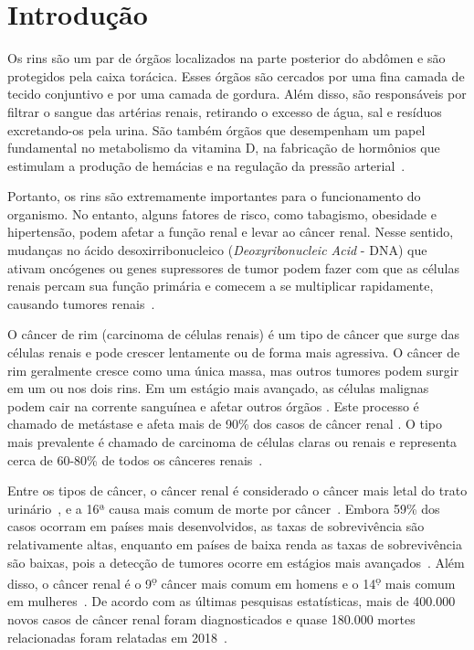 \chapter{Introdução}
\label{cap:introducao}
\phantom{0}

Os rins são um par de órgãos localizados na parte posterior do abdômen e são protegidos pela caixa torácica. Esses órgãos são cercados por uma fina camada de tecido conjuntivo e por uma camada de gordura. Além disso, são responsáveis por filtrar o sangue das artérias renais, retirando o excesso de água, sal e resíduos excretando-os pela urina. São também órgãos que desempenham um papel fundamental no metabolismo da vitamina D, na fabricação de hormônios que estimulam a produção de hemácias e na regulação da pressão arterial~\cite{american_cancer,world_cancer}.

Portanto, os rins são extremamente importantes para o funcionamento do organismo. No entanto, alguns fatores de risco, como tabagismo, obesidade e hipertensão, podem afetar a função renal e levar ao câncer renal. Nesse sentido, mudanças no ácido desoxirribonucleico (\textit{Deoxyribonucleic Acid} - DNA) que ativam oncógenes ou genes supressores de tumor podem fazer com que as células renais percam sua função primária e comecem a se multiplicar rapidamente, causando tumores renais~\cite{american_cancer,uk_cancer,urology_health}.

O câncer de rim (carcinoma de células renais) é um tipo de câncer que surge das células renais e pode crescer lentamente ou de forma mais agressiva. O câncer de rim geralmente cresce como uma única massa, mas outros tumores podem surgir em um ou nos dois rins. Em um estágio mais avançado, as células malignas podem cair na corrente sanguínea e afetar outros órgãos \cite{seyfried2013origin,SHUCH201585}. Este processo é chamado de metástase e afeta mais de 90\% dos casos de câncer renal \cite{american_cancer, ghosn2019ossmar}. O tipo mais prevalente é chamado de carcinoma de células claras ou renais e representa cerca de 60-80\% de todos os cânceres renais~\cite{bray2018global,xu2020checkpoint}.

Entre os tipos de câncer, o câncer renal é considerado o câncer mais letal do trato urinário~\cite{ferlay2015cancer}, e a 16ª causa mais comum de morte por câncer~\cite{world_cancer}. Embora 59\% dos casos ocorram em países mais desenvolvidos, as taxas de sobrevivência são relativamente altas, enquanto em países de baixa renda as taxas de sobrevivência são baixas, pois a detecção de tumores ocorre em estágios mais avançados~\cite{world_cancer}. Além disso, o câncer renal é o 9\textsuperscript{\d o} câncer mais comum em homens e o 14\textsuperscript{\d o} mais comum em mulheres~\cite{znaor2015international,Rossi2018}. De acordo com as últimas pesquisas estatísticas, mais de 400.000 novos casos de câncer renal foram diagnosticados e quase 180.000 mortes relacionadas foram relatadas em 2018~\cite{bray2018global,world_cancer}.

